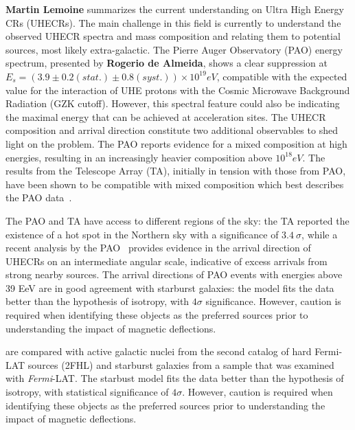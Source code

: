 \documentclass{PoS}
\begin{document}
{\bf Martin Lemoine} summarizes the current understanding on Ultra High Energy CRs (UHECRs). The main challenge in this field is currently to understand the observed UHECR spectra and mass composition and relating them to potential sources, most likely extra-galactic. 
The Pierre Auger Observatory (PAO) energy spectrum, presented by {\bf Rogerio de Almeida}, shows a clear suppression at $E_{s} = (3.9 \pm 0.2(stat.) \pm
0.8(syst.)) \times 10^{19} eV$, compatible with the expected value for the interaction of UHE protons with the Cosmic Microwave Background Radiation (GZK cutoff). However, this spectral feature could also be indicating the maximal energy that can be achieved at acceleration sites. 
The UHECR composition and arrival direction constitute two additional observables to shed light on the problem. The PAO reports evidence for a mixed composition at high energies, resulting in an increasingly heavier composition above $10^{18} eV$. The results from the Telescope Array (TA), initially in tension with those from PAO, have been shown to be compatible with mixed composition which best describes the PAO data~\cite{vitor}. 

The PAO and TA have access to different regions of the sky: the TA reported the existence of a hot spot in the Northern sky with a significance of $3.4~\sigma$, while a recent analysis by the PAO~\cite{Aab:2018chp} provides evidence in the arrival direction of
UHECRs on an intermediate angular scale, indicative of excess arrivals from strong nearby sources. 
The arrival directions of PAO events with energies above 39 EeV 
are in good agreement with starburst galaxies: the model fits the data better than the hypothesis of isotropy, with $4\sigma$ significance. However, caution is required when identifying these objects as the preferred 
sources prior to understanding the impact of magnetic deflections. 


are compared with active galactic nuclei from the second catalog of hard Fermi-LAT sources (2FHL) and starburst galaxies from a sample that was examined with \textit{Fermi}-LAT. The starbust model fits the data better than the hypothesis of isotropy, with statistical significance of $4\sigma$. However, caution is required when identifying these objects as the preferred 
sources prior to understanding the impact of magnetic deflections. 
\end{document}
